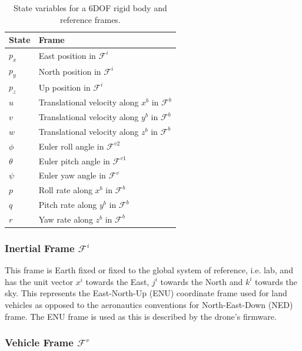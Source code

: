 \begin{table}[H]
 \centering
 \begin{tabular}{|l|l|}
 \hline
    State & Frame \\
 \hline
    $p_x$ & East position in $\mathcal{F}^i$ \\
 \hline
    $p_y$ & North position in $\mathcal{F}^i$ \\
 \hline
    $p_z$ & Up position in $\mathcal{F}^i$  \\
 \hline
    $u$ & Translational velocity along $x^b$ in $\mathcal{F}^b$ \\
 \hline
    $v$ & Translational velocity along $y^b$ in $\mathcal{F}^b$ \\ 
 \hline
    $w$ & Translational velocity along $z^b$ in $\mathcal{F}^b$ \\
 \hline
    $\phi$ & Euler roll angle in $\mathcal{F}^{v2}$ \\
 \hline
    $\theta$ & Euler pitch angle in  $\mathcal{F}^{v1}$ \\
 \hline
    $\psi$ & Euler yaw angle in $\mathcal{F}^v$ \\
 \hline
    $p$ & Roll rate along $x^b$ in $\mathcal{F}^b$ \\ 
 \hline
    $q$ & Pitch rate along $y^b$ in $\mathcal{F}^b$ \\ 
 \hline
    $r$ & Yaw rate along $z^b$ in $\mathcal{F}^b$ \\ 
 \hline
\end{tabular}
 \caption{State variables for a 6DOF rigid body and reference frames.}
  \label{table:state_variables}
\end{table}



\subsubsection{Inertial Frame \texorpdfstring{$\mathcal{F}^{i}$}{Inertial Frame}}

This frame is Earth fixed or fixed to the global system of reference, i.e. lab, and has the unit vector $x^i$ towards the East, $j^i$ towards the North and $k^i$ towards the sky. This represents the East-North-Up (ENU) coordinate frame used for land vehicles as opposed to the aeronautics conventions for North-East-Down (NED) frame. The ENU frame is used as this is described by the drone's firmware.\\

\subsubsection{Vehicle Frame \texorpdfstring{$\mathcal{F}^{v}$}{Vehicle Frame}}


